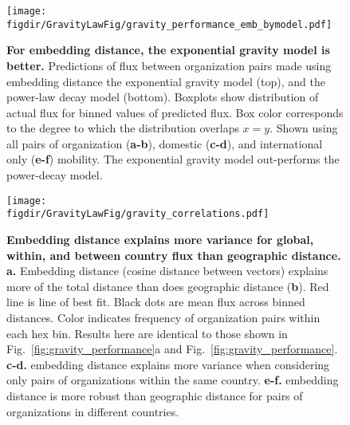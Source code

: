 \documentclass[12pt]{article} %
\def\figdir{../Figs}
\begin{document}
%
%
\begin{figure}[p!]
	\centering
	\texttt{[image: \\figdir/GravityLawFig/gravity\_performance\_emb\_bymodel.pdf]}
	\caption{
		\textbf{For embedding distance, the exponential gravity model is better.}
		Predictions of flux between organization pairs made using embedding distance the exponential gravity model (top), and the power-law decay model (bottom). 
		Boxplots show distribution of actual flux for binned values of predicted flux.
		Box color corresponds to the degree to which the distribution overlaps $x = y$.
		Shown using all pairs of organization (\textbf{a-b}), domestic (\textbf{c-d}), and international only (\textbf{e-f}) mobility. 
		The exponential gravity model out-performs the power-decay model. 
	}
	\label{fig:supp:predict_emb_bymodel}
\end{figure}



%
%
\begin{figure}[p!]
	\centering
	\texttt{[image: \\figdir/GravityLawFig/gravity\_correlations.pdf]}
	\caption{
		\textbf{Embedding distance explains more variance for global, within, and between country flux than geographic distance.}
		\textbf{a.}
		Embedding distance (cosine distance between vectors) explains more of the total distance than does geographic distance (\textbf{b}).
		Red line is line of best fit.
		Black dots are mean flux across binned distances.
		Color indicates frequency of organization pairs within each hex bin.
		Results here are identical to those shown in Fig.~\ref{fig:gravity_performance}a and Fig.~\ref{fig:gravity_performance}.
		\textbf{c-d.}	embedding distance explains more variance when considering only pairs of organizations within the same country.
		\textbf{e-f.} embedding distance is more robust than geographic distance for pairs of organizations in different countries.
	}
	\label{fig:supp:gravity_correlation}
\end{figure}
\end{document}
